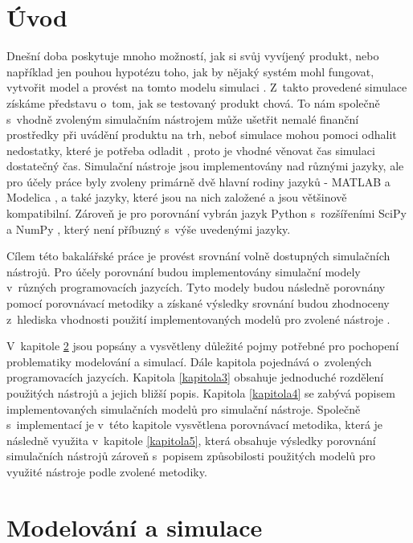 \chapter{Úvod}

Dnešní doba poskytuje mnoho možností, jak si svůj vyvíjený produkt, nebo například jen pouhou hypotézu toho, jak by nějaký systém mohl fungovat, vytvořit model a provést na tomto modelu simulaci \cite{NEGRAO20113051}. Z~takto provedené simulace získáme představu o~tom, jak se testovaný produkt chová. To nám společně s~vhodně zvoleným simulačním nástrojem může ušetřit nemalé finanční prostředky při uvádění produktu na trh, neboť simulace mohou pomoci odhalit nedostatky, které je potřeba odladit \cite{cohen2010cost}, proto je vhodné věnovat čas simulaci dostatečný čas. Simulační nástroje jsou implementovány nad různými jazyky, ale pro účely práce byly zvoleny primárně dvě hlavní rodiny jazyků - MATLAB \cite{MATLAB:2010} a Modelica \cite{Fritzson02modelica--}, a také jazyky, které jsou na nich založené a jsou většinově kompatibilní. Zároveň je pro porovnání vybrán jazyk Python s~rozšířeními SciPy a NumPy \cite{scipy}, který není příbuzný s~výše uvedenými jazyky.

Cílem této bakalářské práce je provést srovnání volně dostupných simulačních nástrojů. Pro účely porovnání budou implementovány simulační modely v~různých programovacích jazycích. Tyto modely budou následně porovnány pomocí porovnávací metodiky a získané výsledky srovnání budou zhodnoceny z~hlediska vhodnosti použití implementovaných modelů pro zvolené nástroje \cite{jones2004traffic}.

V~kapitole \ref{kapitola2} jsou popsány a vysvětleny důležité pojmy potřebné pro pochopení problematiky modelování a simulací. Dále kapitola pojednává o~zvolených programovacích jazycích. Kapitola \ref{kapitola3} obsahuje jednoduché rozdělení použitých nástrojů a jejich bližší popis. Kapitola \ref{kapitola4} se zabývá popisem implementovaných simulačních modelů pro simulační nástroje. Společně s~implementací je v~této kapitole vysvětlena porovnávací metodika, která je následně využita v~kapitole \ref{kapitola5}, která obsahuje výsledky porovnání simulačních nástrojů zároveň s~popisem způsobilosti použitých modelů pro využité nástroje podle zvolené metodiky.

\chapter{Modelování a simulace}
\label{kapitola2}

